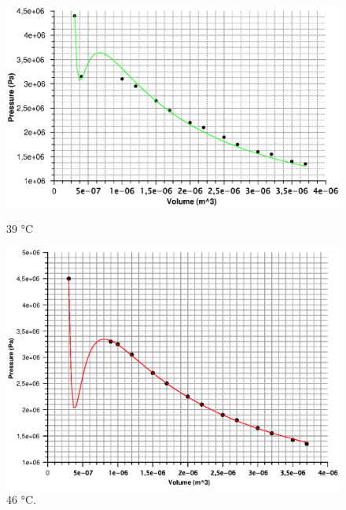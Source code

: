 \documentclass{scrartcl}
\begin{document}
\begin{figure}[!tbp]
  \centering
  \begin{minipage}[b]{0.4\textwidth}
    \includegraphics[width=\textwidth]{vdw39.eps}
    \caption{39 °C}
  \end{minipage}
  \hfill
  \begin{minipage}[b]{0.4\textwidth}
    \includegraphics[width=\textwidth]{VdW42C.eps}
    \caption{46 °C.}
  \end{minipage}
\end{figure}
\end{document}
